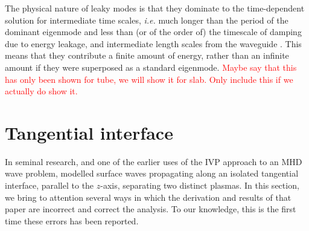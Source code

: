 \documentclass[12pt]{../style-files/ociamthesis}
\begin{document}
The physical nature of leaky modes is that they dominate to the time-dependent solution for intermediate time scales, \textit{i.e.} much longer than the period of the dominant eigenmode and less than (or of the order of) the timescale of damping due to energy leakage, and intermediate length scales from the waveguide \citep{rud_etal06b,rud_etal02}. This means that they contribute a finite amount of energy, rather than an infinite amount if they were superposed as a standard eigenmode. \textcolor{red}{Maybe say that this has only been shown for tube, we will show it for slab. Only include this if we actually do show it.}


\section{Tangential interface}
\label{sec: IVP int}

In seminal research, and one of the earlier uses of the IVP approach to an MHD wave problem, \cite{rae_etal81} modelled surface waves propagating along an isolated tangential interface, parallel to the $z$-axis, separating two distinct plasmas. In this section, we bring to attention several ways in which the derivation and results of that paper are incorrect and correct the analysis. To our knowledge, this is the first time these errors has been reported.
\end{document}
